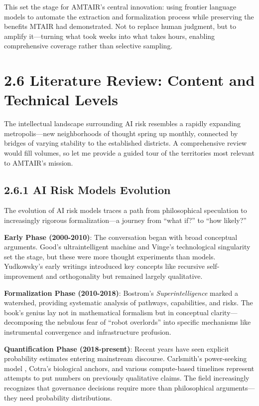 \documentclass[
  11pt,
  letterpaper,
]{book}
\begin{document}
This set the stage for AMTAIR's central innovation: using frontier
language models to automate the extraction and formalization process
while preserving the benefits MTAIR had demonstrated. Not to replace
human judgment, but to amplify it---turning what took weeks into what
takes hours, enabling comprehensive coverage rather than selective
sampling.

\section{2.6 Literature Review: Content and Technical
Levels}\label{sec-literature-review}

The intellectual landscape surrounding AI risk resembles a rapidly
expanding metropolis---new neighborhoods of thought spring up monthly,
connected by bridges of varying stability to the established districts.
A comprehensive review would fill volumes, so let me provide a guided
tour of the territories most relevant to AMTAIR's mission.

\subsection{2.6.1 AI Risk Models
Evolution}\label{sec-risk-models-evolution}

The evolution of AI risk models traces a path from philosophical
speculation to increasingly rigorous formalization---a journey from
``what if?'' to ``how likely?''

\textbf{Early Phase (2000-2010)}: The conversation began with broad
conceptual arguments. Good's ultraintelligent machine
\textcite{good1966} and Vinge's technological singularity set the stage,
but these were more thought experiments than models. Yudkowsky's early
writings \textcite{yudkowsky2008} introduced key concepts like recursive
self-improvement and orthogonality but remained largely qualitative.

\textbf{Formalization Phase (2010-2018)}: Bostrom's
\emph{Superintelligence} \textcite{bostrom2014} marked a watershed,
providing systematic analysis of pathways, capabilities, and risks. The
book's genius lay not in mathematical formalism but in conceptual
clarity---decomposing the nebulous fear of ``robot overlords'' into
specific mechanisms like instrumental convergence and infrastructure
profusion.

\textbf{Quantification Phase (2018-present)}: Recent years have seen
explicit probability estimates entering mainstream discourse.
Carlsmith's power-seeking model \textcite{carlsmith2022}, Cotra's
biological anchors, and various compute-based timelines represent
attempts to put numbers on previously qualitative claims. The field
increasingly recognizes that governance decisions require more than
philosophical arguments---they need probability distributions.
\end{document}
